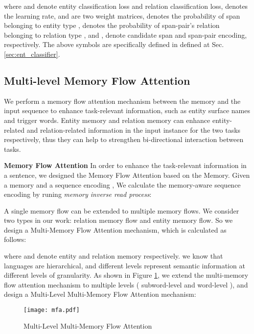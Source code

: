 \documentclass[sigconf]{acmart}
\begin{document}
\noindent where  and  denote entity classification loss and relation classification loss,   denotes the learning rate,  and  are two weight matrices,  denotes the probability of span  belonging to entity type ,  denotes the probability of span-pair's relation  belonging to relation type ,  and ,  denote candidate span and span-pair encoding, respectively. The above symbols are specifically defined in defined at Sec.\ref{sec:ent_classifier}. 


\subsection{Multi-level Memory Flow Attention}

We perform a memory flow attention mechanism between the memory and the input sequence to enhance task-relevant information, such as entity surface names and trigger words. Entity memory and relation memory can enhance entity-related and relation-related information in the input instance for the two tasks respectively, thus they can help to strengthen bi-directional interaction between tasks.




\noindent\textbf{Memory Flow Attention} 
In order to enhance the task-relevant information in a sentence, we designed the Memory Flow Attention based on the Memory. Given a memory  and a sequence encoding , We calculate the memory-aware sequence encoding by runing \textit{memory inverse read process}:




A single memory flow can be extended to multiple memory flows. We consider two types in our work: relation memory flow and entity memory flow. So we design a Multi-Memory Flow Attention mechanism,  which is calculated as follows:






\noindent where  and   denote entity and relation memory respectively. we know that languages are hierarchical, and different levels represent semantic information at different levels of granularity. As shown in Figure \ref{fig:mfa}, we extend the multi-memory flow attention mechanism to multiple levels ( subword-level and word-level ), and design a Multi-Level Multi-Memory Flow Attention mechanism:

\begin{figure}[h]
  \centering
  \texttt{[image: mfa.pdf]}
  \caption{Multi-Level Multi-Memory Flow Attention}
   \label{fig:mfa}
\end{figure}
\end{document}
